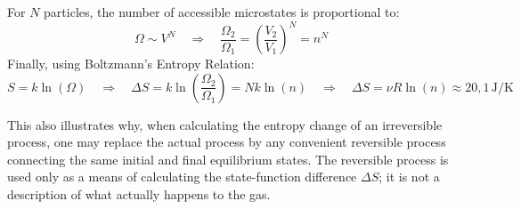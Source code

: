 For $N$ particles, the number of accessible microstates is proportional to:
\begin{equation*}
	\Omega \sim V^N
	\quad\Rightarrow\quad
	\frac{\Omega_2}{\Omega_1} = \left(\frac{V_2}{V_1}\right)^N
	=
	n^N
\end{equation*}
Finally, using Boltzmann's Entropy Relation:
\begin{equation*}
	S = k \ln(\Omega)
	\quad\Rightarrow\quad
	\Delta S = k \ln\left(\frac{\Omega_2}{\Omega_1}\right)
	=
	Nk \ln(n)
	\quad\Rightarrow\quad
	\boxed{\Delta S = \nu R \ln(n) \approx 20{,}1\,\mathrm{J/K}}
\end{equation*}

This also illustrates why, when calculating the entropy change of an irreversible process, one may replace the actual process by any convenient reversible process connecting the same initial and final equilibrium states. The reversible process is used only as a means of calculating the state-function difference $\Delta S$; it is not a description of what actually happens to the gas.